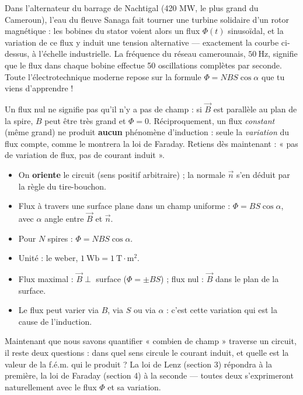 \documentclass[11pt]{article}
\begin{document}
\begin{savaistu}
Dans l'alternateur du barrage de Nachtigal (420 MW, le plus grand du Cameroun), l'eau du fleuve Sanaga fait tourner une turbine solidaire d'un rotor magnétique : les bobines du stator voient alors un flux $\Phi(t)$ sinusoïdal, et la variation de ce flux y induit une tension alternative — exactement la courbe ci-dessus, à l'échelle industrielle. La fréquence du réseau camerounais, $50\ \mathrm{Hz}$, signifie que le flux dans chaque bobine effectue 50 oscillations complètes par seconde. Toute l'électrotechnique moderne repose sur la formule $\Phi = NBS\cos\alpha$ que tu viens d'apprendre !
\end{savaistu}

\begin{attention}
Un flux nul ne signifie pas qu'il n'y a pas de champ : si $\vec{B}$ est parallèle au plan de la spire, $B$ peut être très grand et $\Phi = 0$. Réciproquement, un flux \emph{constant} (même grand) ne produit \textbf{aucun} phénomène d'induction : seule la \emph{variation} du flux compte, comme le montrera la loi de Faraday. Retiens dès maintenant : « pas de variation de flux, pas de courant induit ».
\end{attention}

\begin{aretenir}
\begin{itemize}
\item On \textbf{oriente} le circuit (sens positif arbitraire) ; la normale $\vec{n}$ s'en déduit par la règle du tire-bouchon.
\item Flux à travers une surface plane dans un champ uniforme : $\Phi = B S \cos\alpha$, avec $\alpha$ angle entre $\vec{B}$ et $\vec{n}$.
\item Pour $N$ spires : $\Phi = N B S \cos\alpha$.
\item Unité : le weber, $1\ \mathrm{Wb} = 1\ \mathrm{T\cdot m^2}$.
\item Flux maximal : $\vec{B} \perp$ surface ($\Phi = \pm BS$) ; flux nul : $\vec{B}$ dans le plan de la surface.
\item Le flux peut varier via $B$, via $S$ ou via $\alpha$ : c'est cette variation qui est la cause de l'induction.
\end{itemize}
\end{aretenir}

Maintenant que nous savons quantifier « combien de champ » traverse un circuit, il reste deux questions : dans quel sens circule le courant induit, et quelle est la valeur de la f.é.m. qui le produit ? La loi de Lenz (section 3) répondra à la première, la loi de Faraday (section 4) à la seconde — toutes deux s'exprimeront naturellement avec le flux $\Phi$ et sa variation.
\end{document}
